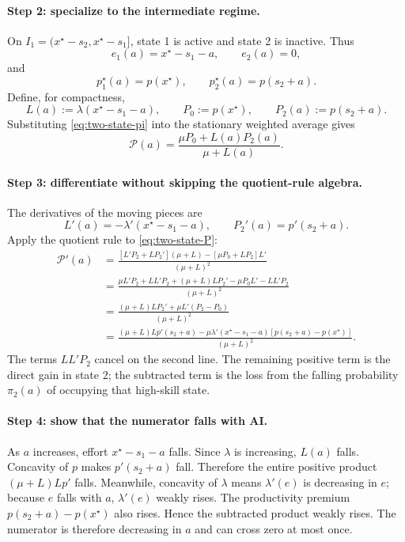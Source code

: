\documentclass[11pt]{article}
\theoremstyle{tutorial}
\theoremstyle{remark}
\newcommand{\1}{\mathbb{I}}
\newcommand{\calP}{\mathcal{P}}
\begin{document}
\paragraph{Step 2: specialize to the intermediate regime.}
On $I_1=(x^\star-s_2,x^\star-s_1]$, state 1 is active and state 2 is inactive.  Thus
\[
e_1(a)=x^\star-s_1-a,
\qquad e_2(a)=0,
\]
and
\[
p_1^\star(a)=p(x^\star),
\qquad p_2^\star(a)=p(s_2+a).
\]
Define, for compactness,
\[
  L(a):=\lambda(x^\star-s_1-a),
  \qquad P_0:=p(x^\star),
  \qquad P_2(a):=p(s_2+a).
\]
Substituting \eqref{eq:two-state-pi} into the stationary weighted average gives
\begin{equation}
\boxed{
\calP(a)=\frac{\mu P_0+L(a)P_2(a)}{\mu+L(a)}.}
\label{eq:two-state-P}
\end{equation}

\paragraph{Step 3: differentiate without skipping the quotient-rule algebra.}
The derivatives of the moving pieces are
\[
L'(a)=-\lambda'(x^\star-s_1-a),
\qquad
P_2'(a)=p'(s_2+a).
\]
Apply the quotient rule to \eqref{eq:two-state-P}:
\begin{align*}
\calP'(a)
&=\frac{[L'P_2+LP_2'](\mu+L)-[\mu P_0+LP_2]L'}{(\mu+L)^2}\\
&=\frac{\mu L'P_2+LL'P_2+(\mu+L)LP_2'
-\mu P_0L'-LL'P_2}{(\mu+L)^2}\\
&=\frac{(\mu+L)LP_2'+\mu L'(P_2-P_0)}{(\mu+L)^2}\\
&=\frac{(\mu+L)Lp'(s_2+a)
-\mu\lambda'(x^\star-s_1-a)[p(s_2+a)-p(x^\star)]}{(\mu+L)^2}.
\end{align*}
The terms $LL'P_2$ cancel on the second line.  The remaining positive term is the direct gain in state 2;
the subtracted term is the loss from the falling probability $\pi_2(a)$ of occupying that high-skill state.

\paragraph{Step 4: show that the numerator falls with AI.}
As $a$ increases, effort $x^\star-s_1-a$ falls.  Since $\lambda$ is increasing,
$L(a)$ falls.  Concavity of $p$ makes $p'(s_2+a)$ fall.  Therefore the entire positive product
$(\mu+L)Lp'$ falls.  Meanwhile, concavity of $\lambda$ means $\lambda'(e)$ is decreasing in $e$; because
$e$ falls with $a$, $\lambda'(e)$ weakly rises.  The productivity premium
$p(s_2+a)-p(x^\star)$ also rises.  Hence the subtracted product weakly rises.  The numerator is therefore
decreasing in $a$ and can cross zero at most once.
\end{document}
